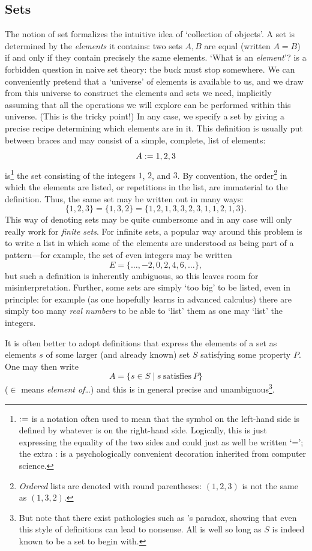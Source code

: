 \subsection{Sets}%
\label{subsec:prelims:sets}
The notion of set formalizes the intuitive idea of `collection of
objects'.  A set is determined by the \emph{elements} it contains: two
sets $A, B$ are equal (written $A = B$) if and only if they contain
precisely the same elements. `What is an \emph{element}'? is a
forbidden question in naive set theory: the buck must stop somewhere.
We can conveniently pretend that a `universe' of elements is available
to us, and we draw from this universe to construct the elements and
sets we need, implicitly assuming that all the operations we will
explore can be performed within this universe. (This is the tricky
point!) In any case, we specify a set by giving a precise recipe
determining which elements are in it. This definition is usually put
between braces and may consist of a simple, complete, list of
elements:
\[A \mathrel{:=} {1, 2, 3}\] is\footnote{$\mathrel{:=}$ is a notation often used to mean
  that the symbol on the left-hand side is defined by whatever is on
  the right-hand side. Logically, this is just expressing the equality
  of the two sides and could just as well be written `='; the extra
  : %
  is a psychologically convenient decoration inherited from computer
  science.} the set consisting of the integers $1$, $2$, and $3$. By
convention, the order\footnote{\emph{Ordered} lists are denoted with
  round parentheses: $(1, 2, 3)$ is not the same as $(1, 3, 2)$.} in
which the elements are listed, or repetitions in the list, are
immaterial to the definition.  Thus, the same set may be written out
in many ways:
\[\{1, 2, 3\} = \{1, 3, 2\} = \{1, 2, 1, 3, 3, 2, 3, 1, 1, 2, 1,
  3\}.\] This way of denoting sets may be quite cumbersome and in any
case will only really work for \emph{finite sets}. For infinite sets,
a popular way around this problem is to write a list in which some of
the elements are understood as being part of a pattern---for example,
the set of even integers may be written
\[ E = \{\dots , -2, 0, 2, 4, 6, \dots\},\] but such a definition is
inherently ambiguous, so this leaves room for
misinterpretation. Further, some sets are simply `too big' to be
listed, even in principle: for example (as one hopefully learns in
advanced calculus) there are simply too many \emph{real numbers} to be
able to `list' them as one may `list' the integers.

It is often better to adopt definitions that express the elements of a
set as elements $s$ of some larger (and already known) set $S$
satisfying some property $P$.  One may then write
\[A = \{s \in S \mid s\ \mathrm{satisfies}\ P\}\] ($\in$ means
\emph{element of}\dots) and this is in general precise and
unambiguous\footnote{But note that there exist pathologies such as
  's paradox, showing that even this style of
  definitions can lead to nonsense. All is well so long as $S$ is
  indeed known to be a set to begin with.}.

